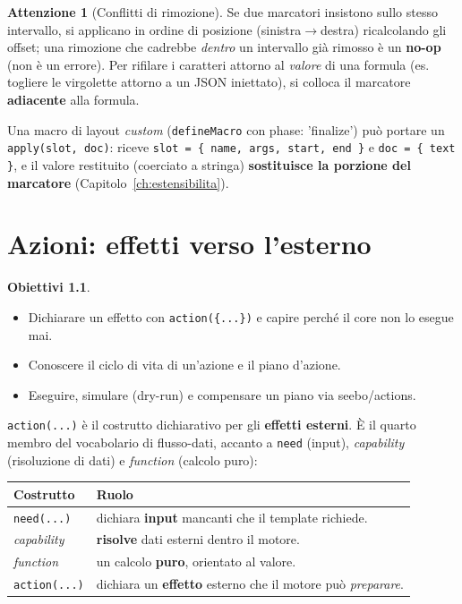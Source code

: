 \documentclass[11pt,a4paper]{book}
\let\code\lstinline
\newcommand{\ic}[1]{{\ttfamily #1}}
\theoremstyle{definition}
\newtheorem*{obiettivi}{Obiettivi}
\newtheorem*{attenzione}{Attenzione}
\begin{document}
{{{{\begin{attenzione}[Conflitti di rimozione]
Se due marcatori insistono sullo stesso intervallo, si applicano in ordine di
posizione (sinistra$\rightarrow$destra) ricalcolando gli offset; una rimozione che
cadrebbe \emph{dentro} un intervallo già rimosso è un \textbf{no-op} (non è un
errore). Per rifilare i caratteri attorno al \emph{valore} di una formula (es.
togliere le virgolette attorno a un JSON iniettato), si colloca il marcatore
\textbf{adiacente} alla formula.
\end{attenzione}

Una macro di layout \emph{custom} (\code|defineMacro| con \ic{phase: 'finalize'})
può portare un \code|apply(slot, doc)|: riceve \verb|slot = { name, args, start, end }|
e \verb|doc = { text }|, e il valore restituito (coerciato a stringa) \textbf{sostituisce
la porzione del marcatore} (Capitolo~\ref{ch:estensibilita}).

\chapter{Azioni: effetti verso l'esterno}
\label{ch:actions}

\begin{obiettivi}
\begin{itemize}
  \item Dichiarare un effetto con \code|action({...})| e capire perché il core non
    lo esegue mai.
  \item Conoscere il ciclo di vita di un'azione e il piano d'azione.
  \item Eseguire, simulare (dry-run) e compensare un piano via \ic{seebo/actions}.
\end{itemize}
\end{obiettivi}

\code|action(...)| è il costrutto dichiarativo per gli \textbf{effetti esterni}. È
il quarto membro del vocabolario di flusso-dati, accanto a \code|need| (input),
\emph{capability} (risoluzione di dati) e \emph{function} (calcolo puro):

\begin{center}
\small
\begin{tabular}{@{}l p{9.2cm}@{}}
\toprule
\textbf{Costrutto} & \textbf{Ruolo} \\
\midrule
\code|need(...)| & dichiara \textbf{input} mancanti che il template richiede. \\
\emph{capability} & \textbf{risolve} dati esterni dentro il motore. \\
\emph{function} & un calcolo \textbf{puro}, orientato al valore. \\
\code|action(...)| & dichiara un \textbf{effetto} esterno che il motore può
\emph{preparare}. \\
\bottomrule
\end{tabular}
\end{center}

}}}}
\end{document}
